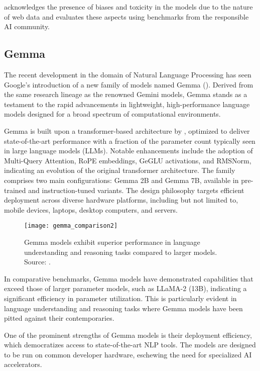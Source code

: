 \textcite{touvron2023llama} acknowledges the presence of biases and toxicity in the models due to the nature of web data and evaluates these aspects using benchmarks from the responsible AI community.

\subsection{Gemma}
\label{subsec:gemma}

The recent development in the domain of Natural Language Processing has seen Google's introduction of a new family of models named Gemma (\textcite{gemma_google_ai, gemmateam2024gemma}).
Derived from the same research lineage as the renowned Gemini models, Gemma stands as a testament to the rapid advancements in lightweight, high-performance language models designed for a broad spectrum of computational environments.

Gemma is built upon a transformer-based architecture by \textcite{vaswani2023attention}, optimized to deliver state-of-the-art performance with a fraction of the parameter count typically seen in large language models (LLMs).
Notable enhancements include the adoption of Multi-Query Attention, RoPE embeddings, GeGLU activations, and RMSNorm, indicating an evolution of the original transformer architecture.
The family comprises two main configurations: Gemma 2B and Gemma 7B, available in pre-trained and instruction-tuned variants.
The design philosophy targets efficient deployment across diverse hardware platforms, including but not limited to, mobile devices, laptops, desktop computers, and servers.

\begin{figure}[ht!]
	\centering
	\texttt{[image: gemma\_comparison2]}
	\caption{Gemma models exhibit superior performance in language understanding and reasoning tasks compared to larger models. Source: \protect\textcite{gemmateam2024gemma}.}
	\label{fig:gemma-comparison2}
\end{figure}

In comparative benchmarks, Gemma models have demonstrated capabilities that exceed those of larger parameter models, such as LLaMA-2 (13B), indicating a significant efficiency in parameter utilization.
This is particularly evident in language understanding and reasoning tasks where Gemma models have been pitted against their contemporaries.

One of the prominent strengths of Gemma models is their deployment efficiency, which democratizes access to state-of-the-art NLP tools.
The models are designed to be run on common developer hardware, eschewing the need for specialized AI accelerators.

